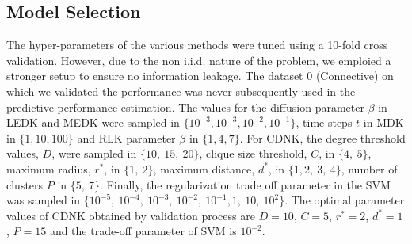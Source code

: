 \documentclass[review]{elsarticle}
\begin{document}
\subsection{Model Selection}
The hyper-parameters of the various methods were tuned using a 10-fold cross validation. However, due to the non i.i.d. nature of the problem, we emploied a stronger setup to ensure no information leakage. The dataset $0$ (Connective) on which we  validated the performance was never subsequently used in the predictive performance estimation. The values for the diffusion parameter $\beta$ in LEDK and MEDK were sampled in $\lbrace 10^{-3}, 10^{-3}, 10^{-2}, 10^{-1} \rbrace$, time steps $t$ in MDK in $\lbrace 1, 10, 100 \rbrace$ and RLK parameter $\beta$ in $\lbrace 1, 4, 7 \rbrace$. For CDNK, the degree threshold values, $D$, were sampled in $\lbrace 10,\ 15,\ 20 \rbrace$, clique size threshold, $C$, in $\lbrace 4,\ 5 \rbrace$, maximum radius, $r^*$, in $\lbrace 1,\ 2 \rbrace$, maximum distance, $d^*$, in $\lbrace 1, 2,\ 3,\ 4 \rbrace$, number of clusters $P$ in $\lbrace 5,\ 7 \rbrace$. Finally, the regularization trade off parameter in the SVM was sampled in $\lbrace 10^{-5},  \ 10^{-4}, \ 10^{-3},\ 10^{-2},\ 10^{-1}, 1,\ 10,\ 10^2 \rbrace$. The optimal parameter values of CDNK obtained by validation process are $D = 10$, $C=5$, $r^*=2$, $d^*=1$, $P=15$ and the trade-off parameter of SVM is $10^{-2}$.
\end{document}
